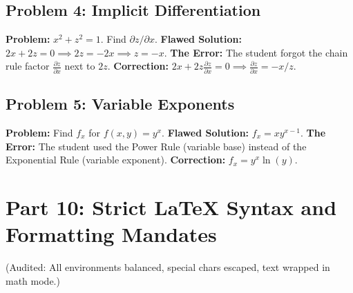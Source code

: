 \documentclass{article}
\begin{document}
\subsection{Problem 4: Implicit Differentiation}
\textbf{Problem:} $x^2 + z^2 = 1$. Find $\partial z / \partial x$.
\textbf{Flawed Solution:}
$2x + 2z = 0 \implies 2z = -2x \implies z = -x$.
\textbf{The Error:} The student forgot the chain rule factor $\frac{\partial z}{\partial x}$ next to $2z$.
\textbf{Correction:} $2x + 2z \frac{\partial z}{\partial x} = 0 \implies \frac{\partial z}{\partial x} = -x/z$.

\subsection{Problem 5: Variable Exponents}
\textbf{Problem:} Find $f_x$ for $f(x,y) = y^x$.
\textbf{Flawed Solution:}
$f_x = x y^{x-1}$.
\textbf{The Error:} The student used the Power Rule (variable base) instead of the Exponential Rule (variable exponent).
\textbf{Correction:} $f_x = y^x \ln(y)$.

\section{Part 10: Strict LaTeX Syntax and Formatting Mandates}
(Audited: All environments balanced, special chars escaped, text wrapped in math mode.)
\end{document}
